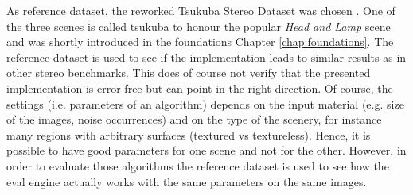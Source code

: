 As reference dataset, the reworked Tsukuba Stereo Dataset was chosen \citep{martull2012realistic}.
One of the three scenes is called tsukuba to honour the popular \textit{Head and Lamp} scene and was shortly introduced in the foundations Chapter \ref{chap:foundations}.
The reference dataset is used to see if the implementation leads to similar results as in other stereo benchmarks.
This does of course not verify that the presented implementation is error-free but can point in the right direction.
Of course, the settings (i.e. parameters of an algorithm) depends on the input material (e.g. size of the images, noise occurrences) and on the type of the scenery, for instance many regions with arbitrary surfaces (textured vs textureless).
Hence, it is possible to have good parameters for one scene and not for the other.
However, in order to evaluate those algorithms the reference dataset is used to see how the eval engine actually works with the same parameters on the same images.

